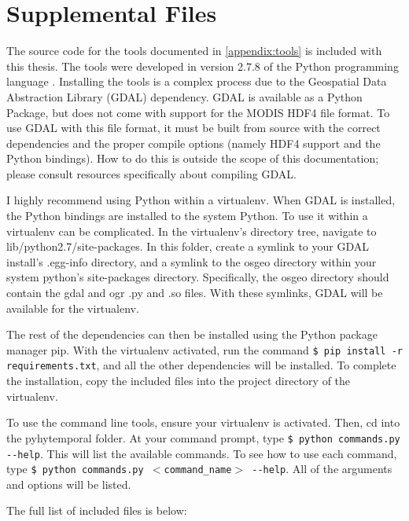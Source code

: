 \chapter{Supplemental Files}
\label{appendix:files}

The source code for the tools documented in \cref{appendix:tools} is included with this thesis. The tools were developed in version 2.7.8 of the Python programming language \autocite{python2.7.8}. Installing the tools is a complex process due to the Geospatial Data Abstraction Library (GDAL) dependency. GDAL is available as a Python Package, but does not come with support for the MODIS HDF4 file format. To use GDAL with this file format, it must be built from source with the correct dependencies and the proper compile options (namely HDF4 support and the Python bindings). How to do this is outside the scope of this documentation; please consult resources specifically about compiling GDAL.

I highly recommend using Python within a virtualenv. When GDAL is installed, the Python bindings are installed to the system Python. To use it within a virtualenv can be complicated. In the virtualenv's directory tree, navigate to lib/python2.7/site-packages. In this folder, create a symlink to your GDAL install's .egg-info directory, and a symlink to the osgeo directory within your system python's site-packages directory. Specifically, the osgeo directory should contain the gdal and ogr .py and .so files. With these symlinks, GDAL will be available for the virtualenv.

The rest of the dependencies can then be installed using the Python package manager pip. With the virtualenv activated, run the command \texttt{\small\$ pip install -r requirements.txt}, and all the other dependencies will be installed. To complete the installation, copy the included files into the project directory of the virtualenv.

To use the command line tools, ensure your virtualenv is activated. Then, cd into the pyhytemporal folder. At your command prompt, type \texttt{\small\$ python commands.py {{-}{-}help}}. This will list the available commands. To see how to use each command, type \texttt{\small\$ python commands.py $<$command\_name$>$ {{-}{-}help}}. All of the arguments and options will be listed.

The full list of included files is below:

